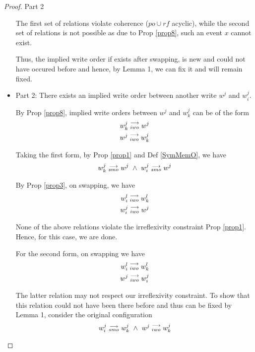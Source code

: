 \begin{proof}{Part 2}
\begin{itemize}
                        The first set of relations violate coherence ($po \cup rf$ acyclic), while the second set of relations is not possible as due to Prop \ref{prop8}, such an event $x$ cannot exist. 

                        Thus, the implied write order if exists after swapping, is new and could not have occured before and hence, by Lemma 1, we can fix it and will remain fixed. 

                    \item Part 2: There exists an implied write order between another write $w^j$ and $w_i^j$.
                    
                        By Prop \ref{prop8}, implied write orders between $w^j$ and $w_k^j$ can be of the form
                        \begin{align*}
                            w_k^j\stackrel{\longrightarrow}{_{iwo}}w^j \\ 
                            w^j\stackrel{\longrightarrow}{_{iwo}}w_k^j
                        \end{align*} 

                        Taking the first form, by Prop \ref{prop1} and Def \ref{SymMemO}, we have 
                        \begin{align*}
                            \reln{w_k^j}{smo}{w^j} \ \wedge \ \reln{w_i^j}{smo}{w^j}
                        \end{align*}

                        By Prop \ref{prop3}, on swapping, we have 
                        \begin{align*}
                            w_i^l\stackrel{\longrightarrow}{_{iwo}}w_k^l \\ 
                            w_i^j\stackrel{\longrightarrow}{_{iwo}}w^j                         
                        \end{align*}

                        None of the above relations violate the irreflexivity constraint Prop \ref{prop1}. Hence, for this case, we are done. 

                        For the second form, on swapping we have 
                        \begin{align*}
                            w_i^l\stackrel{\longrightarrow}{_{iwo}}w_k^l \\ 
                            w^j\stackrel{\longrightarrow}{_{iwo}}w_i^j
                        \end{align*}

                        The latter relation may not respect our irreflexivity constraint. To show that this relation could not have been there before and thus can be fixed by Lemma 1, consider the original configuration
                        \begin{align*}
                            \reln{w_i^j}{smo}{w_k^j} \ \wedge \ \reln{w^j}{iwo}{w_k^j}
                        \end{align*}


\end{itemize}
\end{proof}
